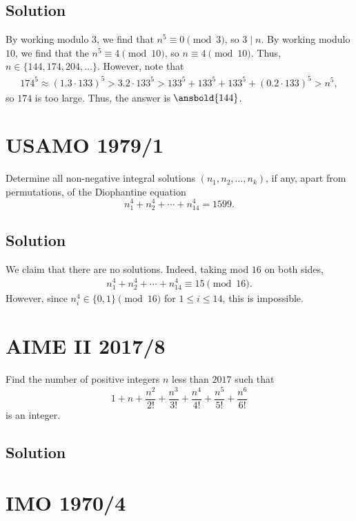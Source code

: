 \documentclass[mast]{lucky}
\begin{document}
\subsection{Solution}

By working modulo $3$, we find that $n^5 \equiv 0 \pmod 3$, so $3 \mid n$. By working modulo $10$, we find that the $n^5 \equiv 4 \pmod{10}$, so $n \equiv 4 \pmod{10}$. Thus, $n \in \{144, 174, 204, \dots\}$. However, note that 
\begin{align*}
174^5 \approx (1.3 \cdot 133)^5 > 3.2 \cdot 133^5 > 133^5 + 133^5 + 133^5 + (0.2 \cdot 133)^5 > n^5,
\end{align*}
so $174$ is too large. Thus, the answer is $\ansbold{144}$.

\pagebreak\section{USAMO 1979/1}

Determine all non-negative integral solutions $(n_1, n_2, \dots , n_k)$, if any, apart from permutations, of the Diophantine equation
$$n_1^4 + n_2^4 + \cdots + n_{14}^{4} = 1599.$$

\subsection{Solution}

We claim that there are no solutions. Indeed, taking mod $16$ on both sides,
\begin{align*}
n_1^4 + n_2^4 + \cdots + n_{14}^4 \equiv 15 \pmod{16}.
\end{align*}
However, since $n_i^4 \in \{0, 1\} \pmod{16}$ for $1 \leq i \leq 14$, this is impossible.

\pagebreak\section{AIME II 2017/8}

Find the number of positive integers $n$ less than $2017$ such that
\[ 1+n+\frac{n^2}{2!}+\frac{n^3}{3!}+\frac{n^4}{4!}+\frac{n^5}{5!}+\frac{n^6}{6!} \]is an integer.

\subsection{Solution}

\pagebreak\section{IMO 1970/4}
\end{document}
